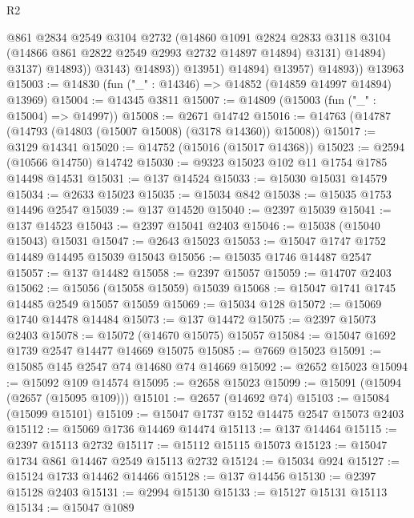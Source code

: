 \begin{lexlean}{R2}
\begin{coremodule}
                            @861
                            @2834
                            @2549
                            @3104
                            @2732
                            (@14860
                              @1091
                              @2824
                              @2833
                              @3118
                              @3104
                              (@14866 @861 @2822 @2549 @2993 @2732 @14897 @14894)
                              @3131)
                            @14894)
                          @3137)
                        @14893))
                    @3143)
                  @14893))
              @13951)
            @14894)
          @13957)
        @14893))
    @13963
@15003 := @14830 (fun ("_" : @14346) => @14852 (@14859 @14997 @14894) @13969)
@15004 := @14345 @3811
@15007 := @14809 (@15003 (fun ("_" : @15004) => @14997))
@15008 := @2671 @14742
@15016 := @14763 (@14787 (@14793 (@14803 (@15007 @15008) (@3178 @14360)) @15008))
@15017 := @3129 @14341
@15020 := @14752 (@15016 (@15017 @14368))
@15023 := @2594 (@10566 @14750) @14742
@15030 := @9323 @15023 @102 @11 @1754 @1785 @14498 @14531
@15031 := @137 @14524
@15033 := @15030 @15031 @14579
@15034 := @2633 @15023
@15035 := @15034 @842
@15038 := @15035 @1753 @14496 @2547
@15039 := @137 @14520
@15040 := @2397 @15039
@15041 := @137 @14523
@15043 := @2397 @15041 @2403
@15046 := @15038 (@15040 @15043) @15031
@15047 := @2643 @15023
@15053 := @15047 @1747 @1752 @14489 @14495 @15039 @15043
@15056 := @15035 @1746 @14487 @2547
@15057 := @137 @14482
@15058 := @2397 @15057
@15059 := @14707 @2403
@15062 := @15056 (@15058 @15059) @15039
@15068 := @15047 @1741 @1745 @14485 @2549 @15057 @15059
@15069 := @15034 @128
@15072 := @15069 @1740 @14478 @14484
@15073 := @137 @14472
@15075 := @2397 @15073 @2403
@15078 := @15072 (@14670 @15075) @15057
@15084 := @15047 @1692 @1739 @2547 @14477 @14669 @15075
@15085 := @7669 @15023
@15091 := @15085 @145 @2547 @74 @14680 @74 @14669
@15092 := @2652 @15023
@15094 := @15092 @109 @14574
@15095 := @2658 @15023
@15099 := @15091 (@15094 (@2657 (@15095 @109)))
@15101 := @2657 (@14692 @74)
@15103 := @15084 (@15099 @15101)
@15109 := @15047 @1737 @152 @14475 @2547 @15073 @2403
@15112 := @15069 @1736 @14469 @14474
@15113 := @137 @14464
@15115 := @2397 @15113 @2732
@15117 := @15112 @15115 @15073
@15123 := @15047 @1734 @861 @14467 @2549 @15113 @2732
@15124 := @15034 @924
@15127 := @15124 @1733 @14462 @14466
@15128 := @137 @14456
@15130 := @2397 @15128 @2403
@15131 := @2994 @15130
@15133 := @15127 @15131 @15113
@15134 := @15047 @1089

\end{coremodule}
\end{lexlean}
